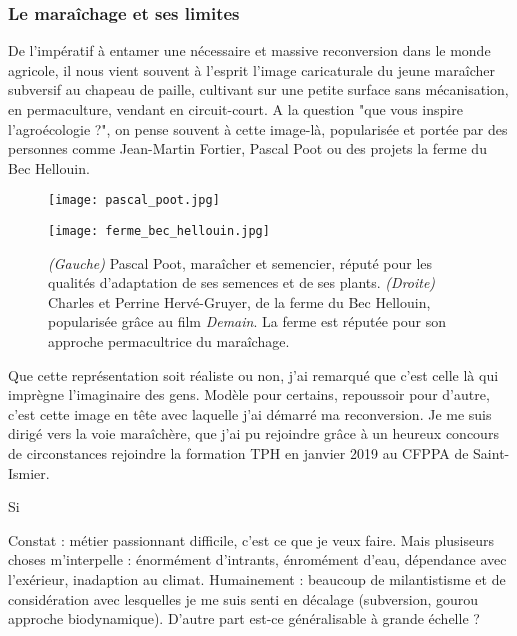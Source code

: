 \documentclass{book}
\begin{document}
\subsubsection{Le maraîchage et ses limites}

De l'impératif à entamer une nécessaire et massive reconversion dans le monde agricole, il nous vient souvent à l'esprit l'image caricaturale du jeune maraîcher subversif au chapeau de paille, cultivant sur une petite surface sans mécanisation, en permaculture, vendant en circuit-court. A la question "que vous inspire l'agroécologie ?", on pense souvent à cette image-là, popularisée et portée par des personnes comme Jean-Martin Fortier, Pascal Poot ou des projets la ferme du Bec Hellouin. 

\begin{figure}[h!]
\centering
\begin{minipage}{.5\textwidth}
  \centering
  \texttt{[image: pascal\_poot.jpg]}
  \label{fig:test1}
\end{minipage}%
\begin{minipage}{.5\textwidth}
  \centering
  \texttt{[image: ferme\_bec\_hellouin.jpg]}
  \label{fig:test2}
\end{minipage}
\caption{\textit{(Gauche)} Pascal Poot, maraîcher et semencier, réputé pour les qualités d'adaptation de ses semences et de ses plants. \textit{(Droite)} Charles et Perrine Hervé-Gruyer, de la ferme du Bec Hellouin, popularisée grâce au film \textit{Demain}. La ferme est réputée pour son approche permacultrice du maraîchage.}
\label{fig:test}
\end{figure}

Que cette représentation soit réaliste ou non, j'ai remarqué que c'est celle là qui imprègne l'imaginaire des gens. Modèle pour certains, repoussoir pour d'autre, c'est  cette image en tête avec laquelle j'ai démarré ma reconversion. Je me suis dirigé vers la voie maraîchère, que j'ai pu rejoindre grâce à un heureux concours de circonstances rejoindre la formation TPH en janvier 2019 au CFPPA de Saint-Ismier. 

Si 

Constat : métier passionnant difficile, c'est ce que je veux faire. Mais plusiseurs choses m'interpelle : énormément d'intrants, énromément d'eau, dépendance avec l'exérieur, inadaption au climat. Humainement : beaucoup de milantistisme et de considération avec lesquelles je me suis senti en décalage (subversion,  gourou approche biodynamique). D'autre part est-ce généralisable à grande échelle ? 
\end{document}
